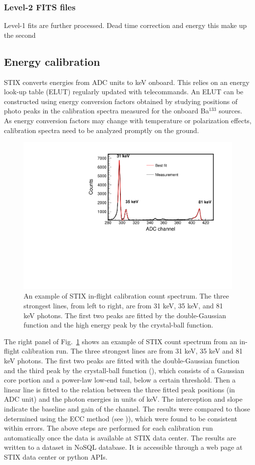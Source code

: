 \documentclass[referee]{aa} %
\begin{document}
\subsubsection{Level-2 FITS files}
Level-1 fits are further processed. 
Dead time  correction and energy this make up the second


\subsection{Energy calibration}
STIX converts energies from ADC units to keV onboard. This relies on
an energy look-up table (ELUT) regularly updated  with telecommands.
An ELUT can be constructed using energy conversion factors obtained by studying
 positions of photo peaks in the calibration spectra measured for the onboard Ba$^{133}$ sources.  
 As energy conversion factors may change with temperature 
 or polarization effects,  calibration spectra need to be analyzed promptly on the ground. 


\begin{figure}
 \centering
  \includegraphics[width=0.8\linewidth]{figures/cal-fit.pdf}
  \caption{An example of STIX in-flight calibration count spectrum.
  The three strongest lines, from left to right, are from 31 keV, 35 keV, and 81 keV
  photons. The first two peaks are fitted by the double-Gaussian function and the high energy peak by  
  the crystal-ball function. }
    \label{fig:cal-fit}
\end{figure}
The right panel of Fig.~\ref{fig:cal-fit} shows 
an example of STIX count spectrum from an in-flight calibration run.  
The three strongest lines are from 31 keV, 35 keV and 81 keV photons. 
The first two peaks are fitted with the double-Gaussian function and the third peak
by the crystall-ball function (\cite{crsystallball}),  which consists of a Gaussian core portion 
and a power-law low-end tail, below a certain threshold.
Then a linear line is fitted to the relation between
the three fitted peak positions (in ADC unit) and the photon energies in units of keV.  
The interception and slope indicate the baseline and gain of the channel. 
The results were compared to those determined using the ECC method (see \cite{ecc,ecc2})), 
 which were found to be consistent within errors.
The above steps are performed for each calibration run automatically 
once the data is available at STIX data center.  The results are written to a
 dataset in  NoSQL database.  It is accessible through a web page at STIX data center or python APIs.
\end{document}
